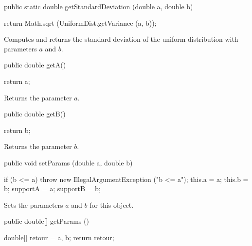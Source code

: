 \begin{htmlonly}
\end{htmlonly}
\begin{code}

   public static double getStandardDeviation (double a, double b)\begin{hide} {
      return Math.sqrt (UniformDist.getVariance (a, b));
   }\end{hide}
\end{code}
\begin{tabb}  Computes and returns the standard deviation
   of the uniform distribution with parameters $a$ and $b$.
\end{tabb}
\begin{htmlonly}
\end{htmlonly}
\begin{code}      

   public double getA()\begin{hide} {
      return a;
   }\end{hide}
\end{code}
  \begin{tabb}
  Returns the parameter $a$.
 \end{tabb}
\begin{code} 

   public double getB()\begin{hide} {
      return b;
   }
\end{hide}
\end{code}
  \begin{tabb}
  Returns the parameter $b$.
 \end{tabb}
\begin{code} 

   public void setParams (double a, double b)\begin{hide} {
      if (b <= a)
         throw new IllegalArgumentException ("b <= a");
      this.a = a;
      this.b = b;
      supportA = a;
      supportB = b;
   }\end{hide}
\end{code}
  \begin{tabb}
  Sets the parameters $a$ and $b$ for this object.
 \end{tabb}
\begin{code}

   public double[] getParams ()\begin{hide} {
      double[] retour = {a, b};
      return retour;
   }\end{hide}
\end{code}
